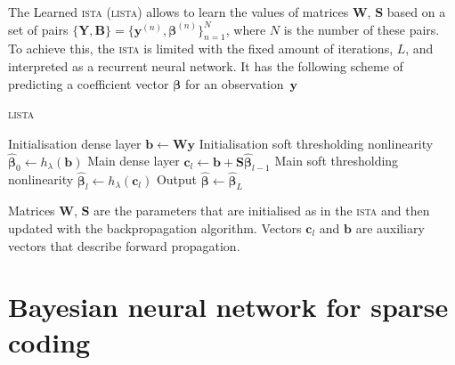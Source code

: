 \documentclass{article}
\begin{document}
The Learned \textsc{ista} (\textsc{lista}) \citep{gregor2010learning} allows to learn the values of matrices $\mathbf{W}$, $\mathbf{S}$ based on a set of pairs $\{\mathbf{Y}, \mathbf{B}\}=\{\mathbf{y}^{(n)}, \boldsymbol\beta^{(n)}\}_{n=1}^N$, where $N$ is the number of these pairs. To achieve this, the \textsc{ista} is limited with the fixed amount of iterations, $L$, and interpreted as a recurrent neural network. It has the following scheme of predicting a coefficient vector $\boldsymbol\beta$ for an observation~$\mathbf{y}$

\begin{algorithm}
  \caption{\textsc{lista}}
  \label{alg:lista}
  \begin{algorithmic}[1]
    \STATE Initialisation dense layer $\mathbf{b} \gets \mathbf{W}\mathbf{y}$ \label{eq:first_layer}
    \STATE Initialisation soft thresholding nonlinearity $\widehat{\boldsymbol\beta}_0 \gets h_\lambda(\mathbf{b})$ \label{eq:thr_first}
			\STATE Main dense layer $\mathbf{c}_l \gets \mathbf{b} + \mathbf{S}\widehat{\boldsymbol\beta}_{l-1}$ \label{eq:l_dense_layer}
			\STATE Main soft thresholding nonlinearity $\widehat{\boldsymbol\beta}_{l} \gets h_\lambda(\mathbf{c}_l)$ \label{eq:l_thr}
		\ENDFOR
		\STATE Output $\widehat{\boldsymbol\beta} \gets \widehat{\boldsymbol\beta}_{L}$
  \end{algorithmic}
\end{algorithm}


Matrices $\mathbf{W}$, $\mathbf{S}$ are the parameters that are initialised as in the \textsc{ista} and then updated with the backpropagation algorithm. Vectors $\mathbf{c}_l$ and $\mathbf{b}$ are auxiliary vectors that describe forward propagation.

\section{Bayesian neural network for sparse coding}
\label{sec:bayesian_lista}
\end{document}
